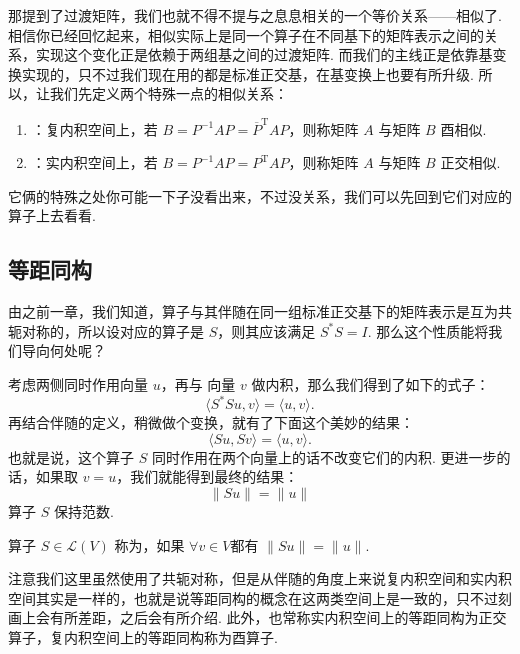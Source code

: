 那提到了过渡矩阵，我们也就不得不提与之息息相关的一个等价关系——相似了. 相信你已经回忆起来，相似实际上是同一个算子在不同基下的矩阵表示之间的关系，实现这个变化正是依赖于两组基之间的过渡矩阵. 而我们的主线正是依靠基变换实现的，只不过我们现在用的都是标准正交基，在基变换上也要有所升级. 所以，让我们先定义两个特殊一点的相似关系：

\begin{definition}
    \begin{enumerate}
        \item {}：复内积空间上，若 $ B = P^{-1}AP = \overline{P}^{\mathrm{T}}AP $，则称矩阵 $ A $ 与矩阵 $ B $ 酉相似.

        \item {}：实内积空间上，若 $ B = P^{-1}AP = {P}^{\mathrm{T}}AP $，则称矩阵 $ A $ 与矩阵 $ B $ 正交相似.
    \end{enumerate}
\end{definition}

它俩的特殊之处你可能一下子没看出来，不过没关系，我们可以先回到它们对应的算子上去看看.

\subsection{等距同构}

由之前一章，我们知道，算子与其伴随在同一组标准正交基下的矩阵表示是互为共轭对称的，所以设对应的算子是 $ S $，则其应该满足 $ S^*S = I $. 那么这个性质能将我们导向何处呢？

考虑两侧同时作用向量 $ u $，再与 向量 $ v $ 做内积，那么我们得到了如下的式子：
\[ \langle S^*Su, v \rangle = \langle u, v \rangle. \]
再结合伴随的定义，稍微做个变换，就有了下面这个美妙的结果：
\[ \langle Su, Sv \rangle = \langle u, v \rangle. \]
也就是说，这个算子 $ S $ 同时作用在两个向量上的话不改变它们的内积. 更进一步的话，如果取 $ v = u $，我们就能得到最终的结果：
\[ \lVert Su \rVert = \lVert u \rVert \]
算子 $ S $ 保持范数.

\begin{definition}[等距同构]
    算子 $ S \in \mathcal{L}(V) $ 称为，如果 $ \forall v \in V $都有 $ \lVert Su \rVert = \lVert u \rVert $.
\end{definition}

注意我们这里虽然使用了共轭对称，但是从伴随的角度上来说复内积空间和实内积空间其实是一样的，也就是说等距同构的概念在这两类空间上是一致的，只不过刻画上会有所差距，之后会有所介绍. 此外，也常称实内积空间上的等距同构为正交算子，复内积空间上的等距同构称为酉算子.

